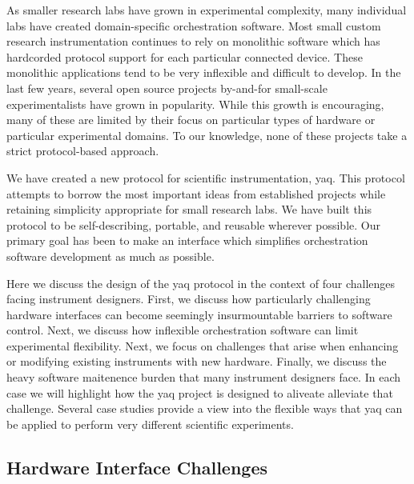 As smaller research labs have grown in experimental complexity, many individual labs have created domain-specific orchestration software.
Most small custom research instrumentation continues to rely on monolithic software which has hardcorded protocol support for each particular connected device.
These monolithic applications tend to be very inflexible and difficult to develop.
In the last few years, several open source projects by-and-for small-scale experimentalists have grown in popularity\cite{WeberSebastien2021a,Bogdanowicz2022,trspectrometer,Koerner_2019,Campagnola_2014,pymeasure,Giesbrecht_2022,pylablib}.
While this growth is encouraging, many of these are limited by their focus on particular types of hardware or particular experimental domains.
To our knowledge, none of these projects take a strict protocol-based approach.

We have created a new protocol for scientific instrumentation, yaq.
This protocol attempts to borrow the most important ideas from established projects while retaining simplicity appropriate for small research labs.
We have built this protocol to be self-describing, portable, and reusable wherever possible.
Our primary goal has been to make an interface which simplifies orchestration software development as much as possible.

Here we discuss the design of the yaq protocol in the context of four challenges facing instrument designers.
First, we discuss how particularly challenging hardware interfaces can become seemingly insurmountable barriers to software control.
Next, we discuss how inflexible orchestration software can limit experimental flexibility.
Next, we focus on challenges that arise when enhancing or modifying existing instruments with new hardware.
Finally, we discuss the heavy software maitenence burden that many instrument designers face.
In each case we will highlight how the yaq project is designed to aliveate alleviate that challenge.
Several case studies provide a view into the flexible ways that yaq can be applied to perform very different scientific experiments.

\subsection{Hardware Interface Challenges}

